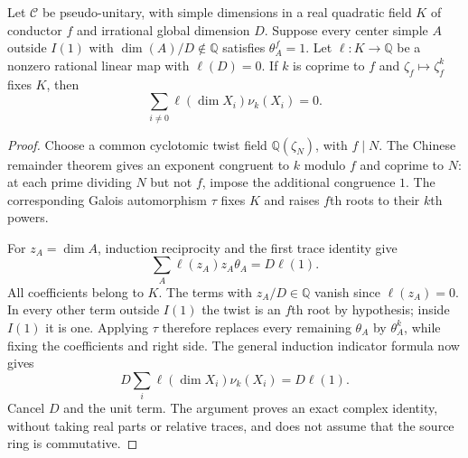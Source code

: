 \begin{lemma}
\label{lem:saturated-galois-indicator}
Let $\mathcal C$ be pseudo-unitary, with simple dimensions in a real
quadratic field $K$ of conductor $f$ and irrational global dimension
$D$. Suppose every center simple $A$ outside $I(1)$ with
$\dim(A)/D\notin\mathbb Q$ satisfies $\theta_A^f=1$.
Let $\ell:K\longrightarrow\mathbb Q$ be a nonzero rational linear map
with $\ell(D)=0$. If $k$ is coprime to $f$ and
$\zeta_f\mapsto\zeta_f^k$ fixes $K$, then
\begin{equation}\label{eq:saturated-galois-indicator}
\sum_{i\ne0}\ell(\dim X_i)\nu_k(X_i)=0.
\end{equation}
\end{lemma}
\begin{proof}
Choose a common cyclotomic twist field $\mathbb Q(\zeta_N)$, with
$f\mid N$. The Chinese remainder theorem gives an exponent congruent
to $k$ modulo $f$ and coprime to $N$: at each prime dividing $N$ but
not $f$, impose the additional congruence $1$. The corresponding
Galois automorphism $\tau$ fixes $K$ and raises $f$th roots to their
$k$th powers.

For $z_A=\dim A$, induction reciprocity and the first trace identity
\cite[Theorem~2.5]{OstrikPiv3} give
\[
\sum_A\ell(z_A)z_A\theta_A=D\ell(1).
\]
All coefficients belong to $K$. The terms with $z_A/D\in\mathbb Q$
vanish since $\ell(z_A)=0$. In every other term outside $I(1)$ the
twist is an $f$th root by hypothesis; inside $I(1)$ it is one.
Applying $\tau$ therefore replaces every remaining $\theta_A$ by
$\theta_A^k$, while fixing the coefficients and right side. The general
induction indicator formula \cite[Theorem~4.1]{NgIndicators} now gives
\[
D\sum_i\ell(\dim X_i)\nu_k(X_i)=D\ell(1).
\]
Cancel $D$ and the unit term. The argument proves an exact complex
identity, without taking real parts or relative traces, and does not
assume that the source ring is commutative.
\end{proof}

